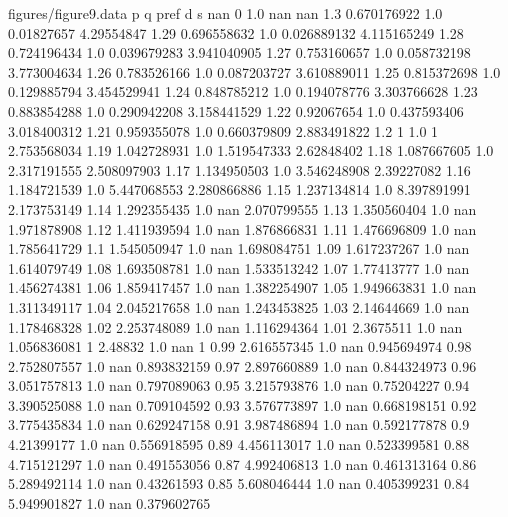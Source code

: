 \begin{filecontents}{figures/figure9.data}
p	q		pref	d		s
nan	0		1.0	nan		nan
1.3	0.670176922	1.0	0.01827657	4.29554847
1.29	0.696558632	1.0	0.026889132	4.115165249
1.28	0.724196434	1.0	0.039679283	3.941040905
1.27	0.753160657	1.0	0.058732198	3.773004634
1.26	0.783526166	1.0	0.087203727	3.610889011
1.25	0.815372698	1.0	0.129885794	3.454529941
1.24	0.848785212	1.0	0.194078776	3.303766628
1.23	0.883854288	1.0	0.290942208	3.158441529
1.22	0.92067654	1.0	0.437593406	3.018400312
1.21	0.959355078	1.0	0.660379809	2.883491822
1.2	1		1.0	1		2.753568034
1.19	1.042728931	1.0	1.519547333	2.62848402
1.18	1.087667605	1.0	2.317191555	2.508097903
1.17	1.134950503	1.0	3.546248908	2.39227082
1.16	1.184721539	1.0	5.447068553	2.280866886
1.15	1.237134814	1.0	8.397891991	2.173753149
1.14	1.292355435	1.0	nan		2.070799555
1.13	1.350560404	1.0	nan		1.971878908
1.12	1.411939594	1.0	nan		1.876866831
1.11	1.476696809	1.0	nan		1.785641729
1.1	1.545050947	1.0	nan		1.698084751
1.09	1.617237267	1.0	nan		1.614079749
1.08	1.693508781	1.0	nan		1.533513242
1.07	1.77413777	1.0	nan		1.456274381
1.06	1.859417457	1.0	nan		1.382254907
1.05	1.949663831	1.0	nan		1.311349117
1.04	2.045217658	1.0	nan		1.243453825
1.03	2.14644669	1.0	nan		1.178468328
1.02	2.253748089	1.0	nan		1.116294364
1.01	2.3675511	1.0	nan		1.056836081
1	2.48832		1.0	nan		1
0.99	2.616557345	1.0	nan		0.945694974
0.98	2.752807557	1.0	nan		0.893832159
0.97	2.897660889	1.0	nan		0.844324973
0.96	3.051757813	1.0	nan		0.797089063
0.95	3.215793876	1.0	nan		0.75204227
0.94	3.390525088	1.0	nan		0.709104592
0.93	3.576773897	1.0	nan		0.668198151
0.92	3.775435834	1.0	nan		0.629247158
0.91	3.987486894	1.0	nan		0.592177878
0.9	4.21399177	1.0	nan		0.556918595
0.89	4.456113017	1.0	nan		0.523399581
0.88	4.715121297	1.0	nan		0.491553056
0.87	4.992406813	1.0	nan		0.461313164
0.86	5.289492114	1.0	nan		0.43261593
0.85	5.608046444	1.0	nan		0.405399231
0.84	5.949901827	1.0	nan		0.379602765
\end{filecontents}
